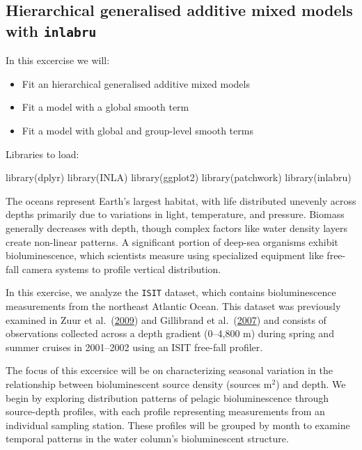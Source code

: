 \documentclass[
  letterpaper,
  DIV=11,
  numbers=noendperiod]{scrartcl}
\newenvironment{Shaded}{\begin{snugshade}}{\end{snugshade}}
\newcommand{\FunctionTok}[1]{\textcolor[rgb]{0.28,0.35,0.67}{#1}}
\newcommand{\NormalTok}[1]{\textcolor[rgb]{0.00,0.23,0.31}{#1}}
\providecommand{\tightlist}{%
  \setlength{\itemsep}{0pt}\setlength{\parskip}{0pt}}\usepackage{longtable,booktabs,array}
\begin{document}
\subsection{\texorpdfstring{Hierarchical generalised additive mixed
models with
\texttt{inlabru}}{Hierarchical generalised additive mixed models with inlabru}}\label{hierarchical-generalised-additive-mixed-models-with-inlabru}

In this excercise we will:

\begin{itemize}
\tightlist
\item
  Fit an hierarchical generalised additive mixed models
\item
  Fit a model with a global smooth term
\item
  Fit a model with global and group-level smooth terms
\end{itemize}

Libraries to load:

\begin{Shaded}
\begin{Highlighting}[]
\FunctionTok{library}\NormalTok{(dplyr)}
\FunctionTok{library}\NormalTok{(INLA)}
\FunctionTok{library}\NormalTok{(ggplot2)}
\FunctionTok{library}\NormalTok{(patchwork)}
\FunctionTok{library}\NormalTok{(inlabru)     }
\end{Highlighting}
\end{Shaded}

The oceans represent Earth's largest habitat, with life distributed
unevenly across depths primarily due to variations in light,
temperature, and pressure. Biomass generally decreases with depth,
though complex factors like water density layers create non-linear
patterns. A significant portion of deep-sea organisms exhibit
bioluminescence, which scientists measure using specialized equipment
like free-fall camera systems to profile vertical distribution.

In this exercise, we analyze the \texttt{ISIT} dataset, which contains
bioluminescence measurements from the northeast Atlantic Ocean. This
dataset was previously examined in Zuur et
al.~(\href{https://doi.org/10.1007/978-0-387-87458-6}{2009}) and
Gillibrand et al.~(\href{https://doi.org/10.3354/meps341037}{2007}) and
consists of observations collected across a depth gradient (0--4,800 m)
during spring and summer cruises in 2001--2002 using an ISIT free-fall
profiler.

The focus of this excersice will be on characterizing seasonal variation
in the relationship between bioluminescent source density (sources
m\(^{2}\)) and depth. We begin by exploring distribution patterns of
pelagic bioluminescence through source-depth profiles, with each profile
representing measurements from an individual sampling station. These
profiles will be grouped by month to examine temporal patterns in the
water column's bioluminescent structure.
\end{document}
